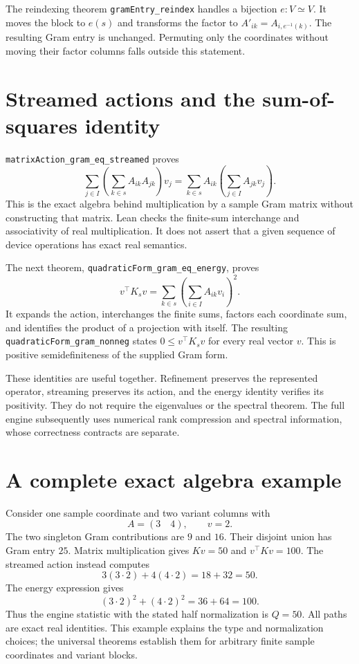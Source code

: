 \documentclass[11pt]{article}
\newcommand{\decl}[1]{\nolinkurl{#1}}
\begin{document}
The reindexing theorem \decl{gramEntry_reindex} handles a bijection
$e:V\simeq V$. It moves the block to $e(s)$ and transforms the factor to
$A'_{ik}=A_{i,e^{-1}(k)}$. The resulting Gram entry is unchanged. Permuting
only the coordinates without moving their factor columns falls outside this
statement.

\section{Streamed actions and the sum-of-squares identity}

\decl{matrixAction_gram_eq_streamed} proves
\[
 \sum_{j\in I}\left(\sum_{k\in s}A_{ik}A_{jk}\right)v_j
 =\sum_{k\in s}A_{ik}\left(\sum_{j\in I}A_{jk}v_j\right).
\]
This is the exact algebra behind multiplication by a sample Gram matrix
without constructing that matrix. Lean checks the finite-sum interchange and
associativity of real multiplication. It does not assert that a given
sequence of device operations has exact real semantics.

The next theorem, \decl{quadraticForm_gram_eq_energy}, proves
\[
 v^\top K_s v=\sum_{k\in s}\left(\sum_{i\in I}A_{ik}v_i\right)^2.
\]
It expands the action, interchanges the finite sums, factors each coordinate
sum, and identifies the product of a projection with itself. The resulting
\decl{quadraticForm_gram_nonneg} states $0\le v^\top K_s v$ for every real
vector $v$. This is positive semidefiniteness of the supplied Gram form.

These identities are useful together. Refinement preserves the represented
operator, streaming preserves its action, and the energy identity verifies
its positivity. They do not require the eigenvalues or the spectral theorem.
The full engine subsequently uses numerical rank compression and spectral
information, whose correctness contracts are separate.

\section{A complete exact algebra example}

Consider one sample coordinate and two variant columns with
\[
 A=(3\quad4),\qquad v=2.
\]
The two singleton Gram contributions are $9$ and $16$. Their disjoint union
has Gram entry $25$. Matrix multiplication gives $Kv=50$ and
$v^\top Kv=100$. The streamed action instead computes
\[
 3(3\cdot2)+4(4\cdot2)=18+32=50.
\]
The energy expression gives
\[
 (3\cdot2)^2+(4\cdot2)^2=36+64=100.
\]
Thus the engine statistic with the stated half normalization is $Q=50$.
All paths are exact real identities. This example explains the type and
normalization choices; the universal theorems establish them for arbitrary
finite sample coordinates and variant blocks.
\end{document}
